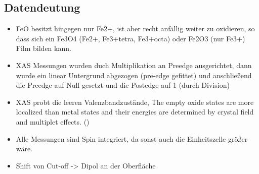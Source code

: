    \subsection{Datendeutung}
        \begin{itemize}
            \item FeO besitzt hingegen nur Fe2+, ist aber recht anfällig weiter zu oxidieren, so dass sich ein Fe3O4 (Fe2+, Fe3+tetra, Fe3+octa) oder Fe2O3 (nur Fe3+) Film bilden kann. 
            \item XAS Messungen wurden duch Multiplikation an Preedge ausgerichtet, dann wurde ein linear Untergrund abgezogen (pre-edge gefittet) und anschließend die Preedge auf Null gesetzt und die Postedge auf 1 (durch Division)
            \item XAS probt die leeren Valenzbandzustände,  The empty oxide states are more localized than metal states and their energies are determined by crystal field and multiplet effects. (\cite{XMCD_XMLD})
            \item Alle Messungen sind Spin integriert, da sonst auch die Einheitszelle größer wäre.
            \item Shift von Cut-off -> Dipol an der Oberfläche~\cite{5A_5}
        \end{itemize}

